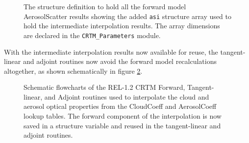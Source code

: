 \begin{figure}[htp]
  \centering
  \caption{The structure definition to hold all the forward model AerosolScatter results showing the added \texttt{asi} structure array used to hold the intermediate interpolation results. The array dimensions are declared in the \texttt{CRTM\_Parameters} module.}
  \label{fig:ASVariables_structure}
\end{figure}

With the intermediate interpolation results now available for reuse, the tangent-linear and adjoint routines now avoid the forward model recalculations altogether, as shown schematically in figure \ref{fig:AtmScatter_Interpolation.new}.

\begin{figure}[htp]
  \centering
  
  \caption{Schematic flowcharts of the REL-1.2 CRTM Forward, Tangent-linear, and Adjoint routines used to interpolate the cloud and aerosol optical properties from the CloudCoeff and AerosolCoeff lookup tables. The forward component of the interpolation is now saved in a structure variable and reused in the tangent-linear and adjoint routines.}
  \label{fig:AtmScatter_Interpolation.new}
\end{figure}

